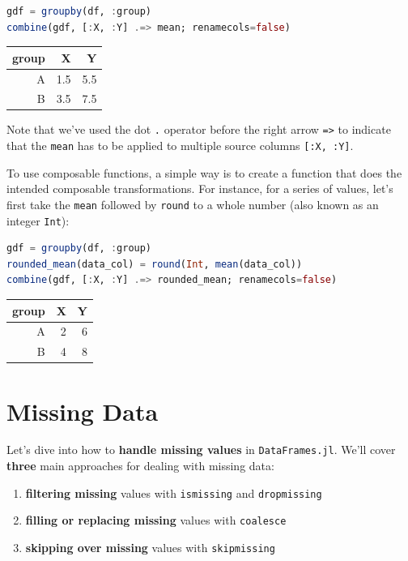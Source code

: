 \documentclass[
  notoc %
]{tufte-book}
\providecommand{\tightlist}{%
  \setlength{\itemsep}{0pt}\setlength{\parskip}{0pt}
}
\newcommand{\passthrough}[1]{#1}
\begin{document}
\begin{lstlisting}[language=Julia]
gdf = groupby(df, :group)
combine(gdf, [:X, :Y] .=> mean; renamecols=false)
\end{lstlisting}

\begin{longtable}[]{@{}rrr@{}}
\toprule
group & X & Y \\
\midrule
\endhead
A & 1.5 & 5.5 \\
B & 3.5 & 7.5 \\
\bottomrule
\end{longtable}

Note that we've used the dot \passthrough{\lstinline!.!} operator before
the right arrow \passthrough{\lstinline!=>!} to indicate that the
\passthrough{\lstinline!mean!} has to be applied to multiple source
columns \passthrough{\lstinline![:X, :Y]!}.

To use composable functions, a simple way is to create a function that
does the intended composable transformations. For instance, for a series
of values, let's first take the \passthrough{\lstinline!mean!} followed
by \passthrough{\lstinline!round!} to a whole number (also known as an
integer \passthrough{\lstinline!Int!}):

\begin{lstlisting}[language=Julia]
gdf = groupby(df, :group)
rounded_mean(data_col) = round(Int, mean(data_col))
combine(gdf, [:X, :Y] .=> rounded_mean; renamecols=false)
\end{lstlisting}

\begin{longtable}[]{@{}rrr@{}}
\toprule
group & X & Y \\
\midrule
\endhead
A & 2 & 6 \\
B & 4 & 8 \\
\bottomrule
\end{longtable}

\hypertarget{sec:missing}{%
\section{Missing Data}\label{sec:missing}}

Let's dive into how to \textbf{handle missing values} in
\passthrough{\lstinline!DataFrames.jl!}. We'll cover \textbf{three} main
approaches for dealing with missing data:

\begin{enumerate}
\def\labelenumi{\arabic{enumi}.}
\tightlist
\item
  \textbf{filtering missing} values with
  \passthrough{\lstinline!ismissing!} and
  \passthrough{\lstinline!dropmissing!}
\item
  \textbf{filling or replacing missing} values with
  \passthrough{\lstinline!coalesce!}
\item
  \textbf{skipping over missing} values with
  \passthrough{\lstinline!skipmissing!}
\end{enumerate}
\end{document}

